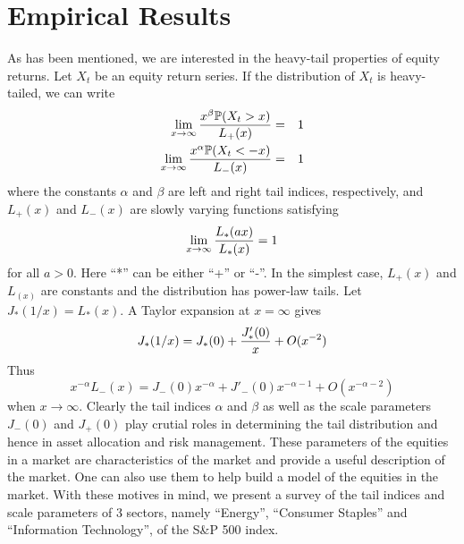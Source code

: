\documentclass{article}
\begin{document}


\section{Empirical Results}
\label{sec:empirical_results}
As has been mentioned, we are interested in the heavy-tail properties
of equity returns. Let $X_t$ be an equity return series. If the
distribution of $X_t$ is heavy-tailed, we can write
\begin{eqnarray*}
  \lim_{x \to \infty} {x^{\beta}\P(X_t > x) \over L_+(x)} &=& 1 \\
  \lim_{x \to \infty} {x^{\alpha}\P(X_t < -x) \over L_-(x)} &=& 1
\end{eqnarray*}
where the constants $\alpha$ and $\beta$ are left and right tail
indices, respectively, and $L_+(x)$ and $L_-(x)$ are slowly varying
functions satisfying
\[
\lim_{x \to \infty} {L_*(a x) \over L_*(x)} = 1
\]
for all $a > 0$. Here ``*'' can be either ``+'' or ``-''. In the
simplest case, $L_+(x)$ and $L_(x)$ are constants and the distribution
has power-law tails. Let $J_*(1/x) = L_*(x)$. A Taylor expansion at
$x=\infty$ gives
\begin{equation}
  \label{eq:scale_parameter}
  J_*(1/x) = J_*(0) + {J'_*(0) \over x} + O(x^{-2})
\end{equation}
Thus
\begin{equation}
  \label{eq:lower_tail_expansion}
  x^{-\alpha} L_-(x) =
  J_-(0) x^{-\alpha} + J'_-(0) x^{-\alpha - 1} + O(x^{-\alpha-2})
\end{equation}
when $x \to \infty$. Clearly the tail indices $\alpha$ and $\beta$ as
well as the scale parameters $J_-(0)$ and $J_+(0)$ play crutial roles
in determining the tail distribution and hence in asset allocation and
risk management. These parameters of the equities in a market are
characteristics of the market and provide a useful description of the
market. One can also use them to help build a model of the equities in
the market. With these motives in mind, we present a survey of the
tail indices and scale parameters of 3 sectors, namely ``Energy'',
``Consumer Staples'' and ``Information Technology'', of the S\&P 500
index.
\end{document}
